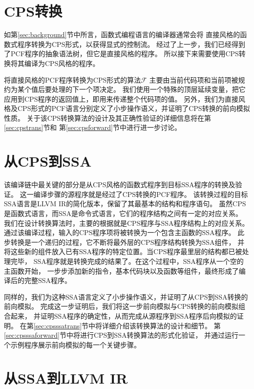 \section{CPS转换}

如第\ref{sec:background}节中所言，函数式编程语言的编译器通常会将
直接风格的函数式程序转换为CPS形式，以获得显式的控制流。
经过了上一步，我们已经得到了PCF程序的抽象语法树，但它是直接风格的程序。
所以接下来需要使用CPS转换将其编译为CPS风格的程序。

将直接风格的PCF程序转换为CPS形式的算法$\mathcal{F}$
主要由当前代码项和当前项被规约为某个值后要处理的下一个项决定。
我们使用一个特殊的顶层延续变量，把它应用到CPS程序的返回值上，即用来传递整个代码项的值。
另外，我们为直接风格及CPS形式的PCF语言分别定义了小步操作语义，并证明了CPS转换的前向模拟性质。
关于该CPS转换算法的设计及其正确性验证的详细信息将在第\ref{sec:cpstrans}节和
第\ref{sec:cpsforward}节中进行进一步讨论。

\section{从CPS到SSA}

该编译链中最关键的部分是从CPS风格的函数式程序到目标SSA程序的转换及验证。
这一编译步骤的源程序就是经过了CPS转换的PCF程序。
该转换过程的目标SSA语言是LLVM IR的简化版本，保留了其最基本的结构和程序语句。
虽然CPS是函数式语言，而SSA是命令式语言，它们的程序结构之间有一定的对应关系。
我们在设计转换算法时，主要的根据就是CPS程序与SSA程序结构上的对应关系。
通过该编译过程，输入的CPS程序项将被转换为一个包含主函数的SSA程序。
此步转换是一个递归的过程，它不断将最外层的CPS程序结构转换为SSA组件，
并将这些新的组件放入已有SSA程序的特定位置。当CPS程序最里层的结构都已被处理完毕，
SSA程序就是转换完成的结果了。在这个过程中，SSA程序从一个空的主函数开始，
一步步添加新的指令，基本代码块以及函数等组件，最终形成了编译后的完整SSA程序。

同样的，我们为这种SSA语言定义了小步操作语义，并证明了从CPS到SSA转换的前向模拟。
完成这一步证明后，我们将这一步前向模拟与CPS转换的前向模拟组合起来，
并证明SSA程序的确定性，从而完成从源程序到SSA程序后向模拟的证明。
在第\ref{sec:cpsssatrans}节中将详细介绍该转换算法的设计和细节。
第\ref{sec:cpsssaforward}节中将进行CPS到SSA转换算法的形式化验证，
并通过运行一个示例程序展示前向模拟的每一个关键步骤。

\section{从SSA到LLVM IR}

